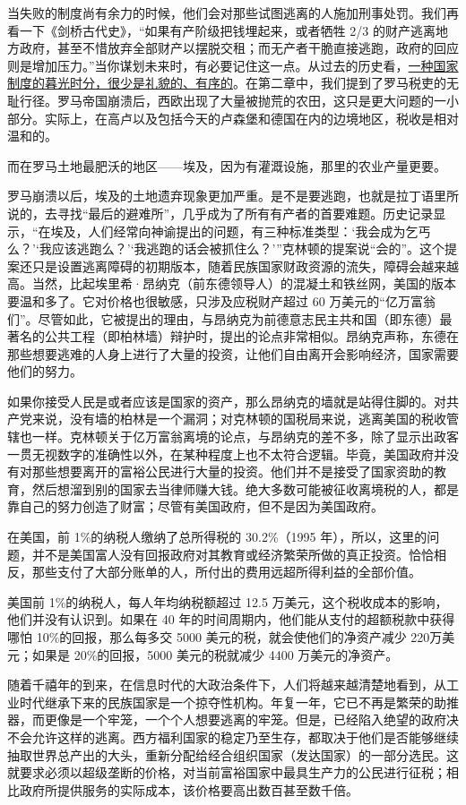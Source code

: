 当失败的制度尚有余力的时候，他们会对那些试图逃离的人施加刑事处罚。我们再看一下《剑桥古代史》，“如果有产阶级把钱埋起来，或者牺牲 2/3 的财产逃离地方政府，甚至不惜放弃全部财产以摆脱交租；而无产者干脆直接逃跑，政府的回应则是增加压力。”当你谋划未来时，有必要记住这一点。从过去的历史看，\uline{一种国家制度的暮光时分，很少是礼貌的、有序的}。在第二章中，我们提到了罗马税吏的无耻行径。罗马帝国崩溃后，西欧出现了大量被抛荒的农田，这只是更大问题的一小部分。实际上，在高卢以及包括今天的卢森堡和德国在内的边境地区，税收是相对温和的。

而在罗马土地最肥沃的地区——埃及，因为有灌溉设施，那里的农业产量更要。

罗马崩溃以后，埃及的土地遗弃现象更加严重。是不是要逃跑，也就是拉丁语里所说的，去寻找“最后的避难所”，几乎成为了所有有产者的首要难题。历史记录显示，“在埃及，人们经常向神谕提出的问题，有三种标准类型：‘我会成为乞丐么？’‘我应该逃跑么？’‘我逃跑的话会被抓住么？’”克林顿的提案说“会的”。这个提案还只是设置逃离障碍的初期版本，随着民族国家财政资源的流失，障碍会越来越高。当然，比起埃里希·昂纳克（前东德领导人）的混凝土和铁丝网，美国的版本要温和多了。它对价格也很敏感，只涉及应税财产超过 60 万美元的“亿万富翁们”。尽管如此，它被提出的理由，与昂纳克为前德意志民主共和国（即东德）最著名的公共工程（即柏林墙）辩护时，提出的论点非常相似。昂纳克声称，东德在那些想要逃难的人身上进行了大量的投资，让他们自由离开会影响经济，国家需要他们的努力。

如果你接受人民是或者应该是国家的资产，那么昂纳克的墙就是站得住脚的。对共产党来说，没有墙的柏林是一个漏洞；对克林顿的国税局来说，逃离美国的税收管辖也一样。克林顿关于亿万富翁离境的论点，与昂纳克的差不多，除了显示出政客一贯无视数字的准确性以外，在某种程度上也不太符合逻辑。毕竟，美国政府并没有对那些想要离开的富裕公民进行大量的投资。他们并不是接受了国家资助的教育，然后想溜到别的国家去当律师赚大钱。绝大多数可能被征收离境税的人，都是靠自己的努力创造了财富；尽管有美国政府，但不是因为美国政府。

在美国，前 1\%的纳税人缴纳了总所得税的 30.2\%（1995 年），所以，这里的问题，并不是美国富人没有回报政府对其教育或经济繁荣所做的真正投资。恰恰相反，那些支付了大部分账单的人，所付出的费用远超所得利益的全部价值。

美国前 1\%的纳税人，每人年均纳税额超过 12.5 万美元，这个税收成本的影响，他们并没有认识到。如果在 40 年的时间周期内，他们能从支付的超额税款中获得哪怕 10\%的回报，那么每多交 5000 美元的税，就会使他们的净资产减少 220万美元；如果是 20\%的回报，5000 美元的税就减少 4400 万美元的净资产。

随着千禧年的到来，在信息时代的大政治条件下，人们将越来越清楚地看到，从工业时代继承下来的民族国家是一个掠夺性机构。年复一年，它已不再是繁荣的助推器，而更像是一个牢笼，一个个人想要逃离的牢笼。但是，已经陷入绝望的政府决不会允许这样的逃离。西方福利国家的稳定乃至生存，都取决于他们是否能够继续抽取世界总产出的大头，重新分配给经合组织国家（发达国家）的一部分选民。这就要求必须以超级垄断的价格，对当前富裕国家中最具生产力的公民进行征税；相比政府所提供服务的实际成本，该价格要高出数百甚至数千倍。


